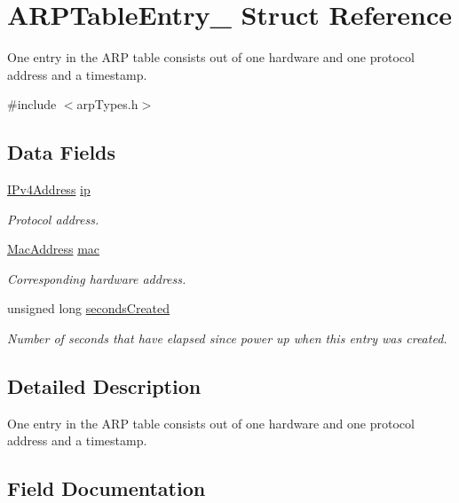 \hypertarget{struct_a_r_p_table_entry__}{}\section{A\+R\+P\+Table\+Entry\+\_\+ Struct Reference}
\label{struct_a_r_p_table_entry__}


One entry in the A\+RP table consists out of one hardware and one protocol address and a timestamp.  




{\ttfamily \#include $<$arp\+Types.\+h$>$}

\subsection*{Data Fields}
\begin{DoxyCompactItemize}
\item 
\mbox{\hyperlink{group__ipv4_gac3530474aec32033cd4709abdc7bded7}{I\+Pv4\+Address}} \mbox{\hyperlink{struct_a_r_p_table_entry___a9eb6364cfba6d26a96b3caa542fd9ed9}{ip}}
\begin{DoxyCompactList}\small\item\em Protocol address. \end{DoxyCompactList}\item 
\mbox{\hyperlink{ethernet_types_8h_a7fed77396097fa92ca5f4b185844244c}{Mac\+Address}} \mbox{\hyperlink{struct_a_r_p_table_entry___a2d3bb97c3d100ba11c2257680d849879}{mac}}
\begin{DoxyCompactList}\small\item\em Corresponding hardware address. \end{DoxyCompactList}\item 
unsigned long \mbox{\hyperlink{struct_a_r_p_table_entry___ad6156a16b2f445f0640d7a6e5d65c98a}{seconds\+Created}}
\begin{DoxyCompactList}\small\item\em Number of seconds that have elapsed since power up when this entry was created. \end{DoxyCompactList}\end{DoxyCompactItemize}


\subsection{Detailed Description}
One entry in the A\+RP table consists out of one hardware and one protocol address and a timestamp. 

\subsection{Field Documentation}
\mbox{\label{struct_a_r_p_table_entry___a9eb6364cfba6d26a96b3caa542fd9ed9}} 
